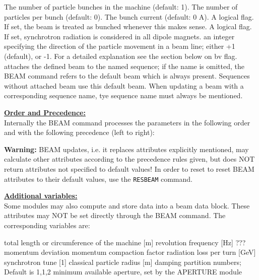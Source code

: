 \begin{madlist}
   The number of particle bunches in the
  machine (default: 1).  
   \label{beam_npart} The number of particles per bunch (default: 0). 
   The bunch current (default: 0 A). 
   A logical flag. If set, the beam is
  treated as bunched whenever this makes sense.  
   \label{beam_radiate} A logical flag. If set, synchrotron
  radiation is considered in all dipole magnets.  
   an integer specifying the direction of the
  particle movement in a beam line; either +1 (default), or -1. For a
  detailed explanation see the section below on bv flag.  
   attaches the defined beam to the named sequence; if
  the name is omitted, the BEAM command refers to the default beam
  which is always present. Sequences without attached beam use this
  default beam. When updating a beam with a corresponding sequence name,
  tye sequence name must always be mentioned.    
\end{madlist} 

{\bf \underline{Order and Precedence:}}\\
Internally the BEAM command processes the parameters in the following
order and with the following precedence (left to right): 


{\bf Warning:} BEAM updates, i.e. it replaces attributes explicitly
mentioned, may calculate other attributes according to the precedence rules
given, but does NOT return attributes not specified to default values! 
In order to reset to reset BEAM attributes to their default values, use
the {\tt RESBEAM} command.


{\bf \underline{Additional variables:}}\\ 
Some \mad modules may also compute and store data into a beam data 
block. These attributes may NOT be set directly through the BEAM
command. The corresponding variables are:  
\begin{madlist}
   total length or circumference of the machine [m]
   revolution frequency [Hz]
   ???
   momentum deviation
   momentum compaction factor
   radiation loss per turn [GeV]
   synchrotron tune [1]
   classical particle radius [m]
   damping partition numbers; Default is {1,1,2}
   minimum available aperture, set by the APERTURE module
\end{madlist}

